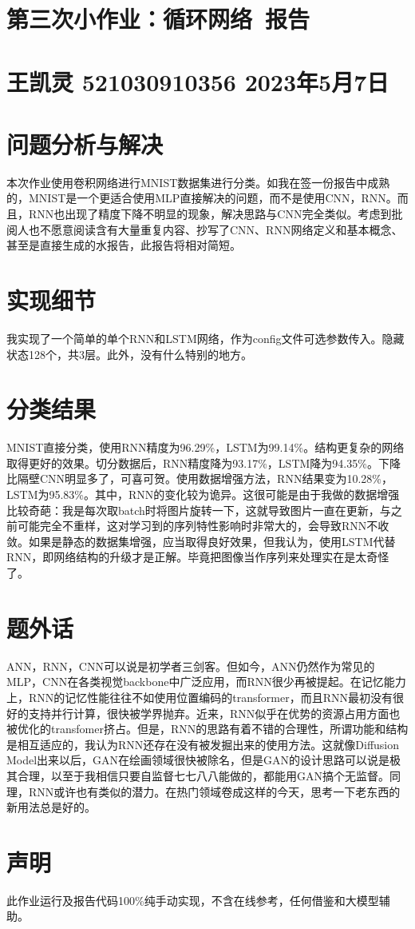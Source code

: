 \documentclass[a4paper]{article}
\begin{document}
	\section*{\Huge 第三次小作业：循环网络~报告}
	\section*{\small 王凯灵 521030910356 2023年5月7日}
	\section*{问题分析与解决}
	本次作业使用卷积网络进行MNIST数据集进行分类。如我在签一份报告中成熟的，MNIST是一个更适合使用MLP直接解决的问题，而不是使用CNN，RNN。而且，RNN也出现了精度下降不明显的现象，解决思路与CNN完全类似。考虑到批阅人也不愿意阅读含有大量重复内容、抄写了CNN、RNN网络定义和基本概念、甚至是直接生成的水报告，此报告将相对简短。
	\section*{实现细节}
	我实现了一个简单的单个RNN和LSTM网络，作为config文件可选参数传入。隐藏状态128个，共3层。此外，没有什么特别的地方。
	
	\section*{分类结果}
	MNIST直接分类，使用RNN精度为96.29\%，LSTM为99.14\%。结构更复杂的网络取得更好的效果。切分数据后，RNN精度降为93.17\%，LSTM降为94.35\%。下降比隔壁CNN明显多了，可喜可贺。使用数据增强方法，RNN结果变为10.28\%，LSTM为95.83\%。其中，RNN的变化较为诡异。这很可能是由于我做的数据增强比较奇葩：我是每次取batch时将图片旋转一下，这就导致图片一直在更新，与之前可能完全不重样，这对学习到的序列特性影响时非常大的，会导致RNN不收敛。如果是静态的数据集增强，应当取得良好效果，但我认为，使用LSTM代替RNN，即网络结构的升级才是正解。毕竟把图像当作序列来处理实在是太奇怪了。
	
	\section*{题外话}
	ANN，RNN，CNN可以说是初学者三剑客。但如今，ANN仍然作为常见的MLP，CNN在各类视觉backbone中广泛应用，而RNN很少再被提起。在记忆能力上，RNN的记忆性能往往不如使用位置编码的transformer，而且RNN最初没有很好的支持并行计算，很快被学界抛弃。近来，RNN似乎在优势的资源占用方面也被优化的transfomer挤占。但是，RNN的思路有着不错的合理性，所谓功能和结构是相互适应的，我认为RNN还存在没有被发掘出来的使用方法。这就像Diffusion Model出来以后，GAN在绘画领域很快被除名，但是GAN的设计思路可以说是极其合理，以至于我相信只要自监督七七八八能做的，都能用GAN搞个无监督。同理，RNN或许也有类似的潜力。在热门领域卷成这样的今天，思考一下老东西的新用法总是好的。
	\section*{声明}
	此作业运行及报告代码100\%纯手动实现，不含在线参考，任何借鉴和大模型辅助。
\end{document}
